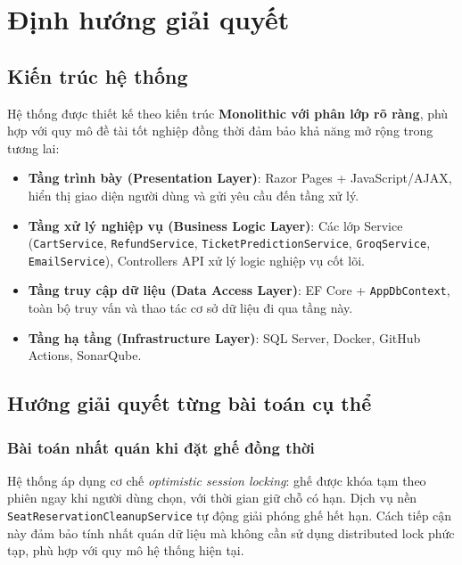 \documentclass[../main.tex]{subfiles}
\begin{document}
\section{Định hướng giải quyết}

\subsection{Kiến trúc hệ thống}

Hệ thống được thiết kế theo kiến trúc \textbf{Monolithic với phân lớp rõ ràng}, phù hợp với quy mô đề tài tốt nghiệp đồng thời đảm bảo khả năng mở rộng trong tương lai:

\begin{itemize}
    \item \textbf{Tầng trình bày (Presentation Layer)}: Razor Pages + JavaScript/AJAX, hiển thị giao diện người dùng và gửi yêu cầu đến tầng xử lý.
    \item \textbf{Tầng xử lý nghiệp vụ (Business Logic Layer)}: Các lớp Service (\texttt{CartService}, \texttt{RefundService}, \texttt{TicketPredictionService}, \texttt{GroqService}, \texttt{EmailService}), Controllers API xử lý logic nghiệp vụ cốt lõi.
    \item \textbf{Tầng truy cập dữ liệu (Data Access Layer)}: EF Core + \texttt{AppDbContext}, toàn bộ truy vấn và thao tác cơ sở dữ liệu đi qua tầng này.
    \item \textbf{Tầng hạ tầng (Infrastructure Layer)}: SQL Server, Docker, GitHub Actions, SonarQube.
\end{itemize}

\subsection{Hướng giải quyết từng bài toán cụ thể}

\subsubsection{Bài toán nhất quán khi đặt ghế đồng thời}

Hệ thống áp dụng cơ chế \textit{optimistic session locking}: ghế được khóa tạm theo phiên ngay khi người dùng chọn, với thời gian giữ chỗ có hạn. Dịch vụ nền \texttt{SeatReservationCleanupService} tự động giải phóng ghế hết hạn. Cách tiếp cận này đảm bảo tính nhất quán dữ liệu mà không cần sử dụng distributed lock phức tạp, phù hợp với quy mô hệ thống hiện tại.
\end{document}
